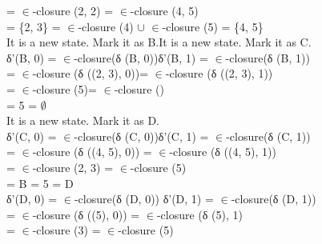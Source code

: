 \documentclass[10pt,a4paper]{book}
\begin{document}
\hspace*{1.2cm} = $\in$-closure (2, 2)\hspace*{3.7cm} = $\in$-closure (4, 5)\\
\hspace*{1.2cm} = \{2, 3\}\hspace*{3.3cm} = $\in$-closure (4) $\cup$ $\in$-closure (5) = \{4, 5\}\\
It is a new state. Mark it as B.\hspace*{2.5cm}It is a new state. Mark it as C.\\
δ'(B, 0) = $\in$-closure(δ (B, 0))\hspace*{2cm}δ'(B, 1) = $\in$-closure(δ (B, 1))\\
 \hspace*{1.3cm}= $\in$-closure (δ ((2, 3), 0))\hspace*{2.6cm}= $\in$-closure (δ ((2, 3), 1))\\
 \hspace*{1.3cm}= $\in$-closure (5)\hspace*{4.2cm}= $\in$-closure ()\\
 \hspace*{1.3cm}= {5}\hspace*{5.9cm} = $\emptyset$\\
It is a new state. Mark it as D.\\
δ'(C, 0) = $\in$-closure(δ (C, 0))\hspace*{2cm}δ'(C, 1) = $\in$-closure(δ (C, 1))\\
 \hspace*{1.3cm}= $\in$-closure (δ ((4, 5), 0))\hspace*{2.5cm} = $\in$-closure (δ ((4, 5), 1))\\
 \hspace*{1.3cm}= $\in$-closure (2, 3)\hspace*{3.7cm} = $\in$-closure (5)\\
 \hspace*{1.3cm}= B\hspace*{5.8cm} = {5} = D\\
δ'(D, 0) = $\in$-closure(δ (D, 0)) \hspace*{1.8cm}δ'(D, 1) = $\in$-closure(δ (D, 1))\\
 \hspace*{1.2cm} = $\in$-closure (δ ((5), 0)) \hspace*{2.8cm}= $\in$-closure (δ (5), 1)\\
 \hspace*{1.2cm} = $\in$-closure (3) \hspace*{4cm}= $\in$-closure (5)\\
\end{document}
